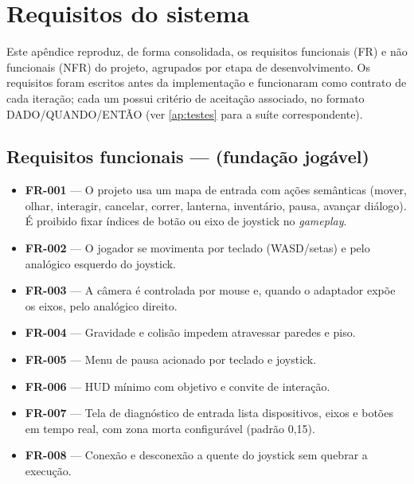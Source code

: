 \chapter{Requisitos do sistema}
\label{ap:requisitos}

Este apêndice reproduz, de forma consolidada, os requisitos funcionais (FR) e
não funcionais (NFR) do projeto, agrupados por etapa de desenvolvimento. Os
requisitos foram escritos antes da implementação e funcionaram como contrato
de cada iteração; cada um possui critério de aceitação associado, no formato
DADO/QUANDO/ENTÃO (ver \autoref{ap:testes} para a suíte correspondente).

\section*{Requisitos funcionais ---  (fundação jogável)}
\label{ap:fr1}
\begin{itemize}
  \item \textbf{FR-001} --- O projeto usa um mapa de entrada com ações
  semânticas (mover, olhar, interagir, cancelar, correr, lanterna, inventário,
  pausa, avançar diálogo). É proibido fixar índices de botão ou eixo de
  joystick no \emph{gameplay}.
  \item \textbf{FR-002} --- O jogador se movimenta por teclado (WASD/setas) e
  pelo analógico esquerdo do joystick.
  \item \textbf{FR-003} --- A câmera é controlada por mouse e, quando o
  adaptador expõe os eixos, pelo analógico direito.
  \item \textbf{FR-004} --- Gravidade e colisão impedem atravessar paredes e
  piso.
  \item \textbf{FR-005} --- Menu de pausa acionado por teclado e joystick.
  \item \textbf{FR-006} --- HUD mínimo com objetivo e convite de interação.
  \item \textbf{FR-007} --- Tela de diagnóstico de entrada lista dispositivos,
  eixos e botões em tempo real, com zona morta configurável (padrão 0,15).
  \item \textbf{FR-008} --- Conexão e desconexão a quente do joystick sem
  quebrar a execução.
\end{itemize}

